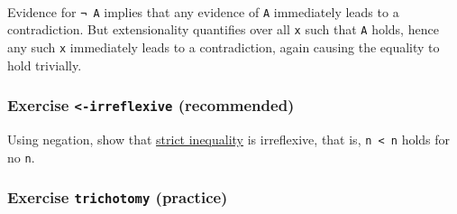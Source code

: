 \begin{fence}
\begin{code}%
\>[0]\AgdaSpace{}%
\AgdaSymbol{:}\AgdaSpace{}%
\AgdaSpace{}%
\AgdaSymbol{\{}\AgdaSpace{}%
\AgdaSymbol{:}\AgdaSpace{}%
\AgdaSymbol{\}}\AgdaSpace{}%
\AgdaSymbol{(}\AgdaSpace{}%
\AgdaSpace{}%
\AgdaSymbol{:}\AgdaSpace{}%
\AgdaSpace{}%
\AgdaSymbol{)}\AgdaSpace{}%
\AgdaSpace{}%
\AgdaSpace{}%
\AgdaSpace{}%
\<%
\\
\>[0]\AgdaSpace{}%
\AgdaSpace{}%
\AgdaSpace{}%
\AgdaSymbol{=}\AgdaSpace{}%
\AgdaSpace{}%
\AgdaSpace{}%
\AgdaSpace{}%
\AgdaSpace{}%
\AgdaSpace{}%
\AgdaSymbol{(}\AgdaSpace{}%
\AgdaSymbol{))}\<%
\end{code}
\end{fence}

Evidence for \texttt{¬\ A} implies that any evidence of \texttt{A}
immediately leads to a contradiction. But extensionality quantifies over
all \texttt{x} such that \texttt{A} holds, hence any such \texttt{x}
immediately leads to a contradiction, again causing the equality to hold
trivially.

\hypertarget{exercise--irreflexive-recommended}{%
\subsubsection{\texorpdfstring{Exercise \texttt{\textless{}-irreflexive}
(recommended)}{Exercise \textless-irreflexive (recommended)}}\label{exercise--irreflexive-recommended}}

Using negation, show that
\protect\hyperlink{Relations-strict-inequality}{strict inequality} is
irreflexive, that is, \texttt{n\ \textless{}\ n} holds for no
\texttt{n}.

\begin{fence}
\begin{code}%
\>[0]\<%
\end{code}
\end{fence}

\hypertarget{exercise-trichotomy-practice}{%
\subsubsection{\texorpdfstring{Exercise \texttt{trichotomy}
(practice)}{Exercise trichotomy (practice)}}\label{exercise-trichotomy-practice}}

